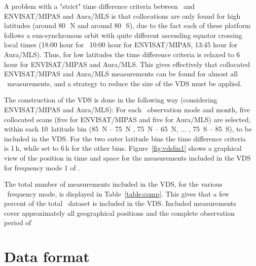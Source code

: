 A problem with a "strict" time difference criteria
between \smr\ and  ENVISAT/MIPAS and Aura/MLS
is that collocations are only found for high latitudes
 (around 80\,\degree\ N and around 80\,\degree\ S),
due to the fact each of these platform follows a sun-synchronous orbit
with quite different ascending equator crossing local times  
(18:00 hour for \smr\, 10:00 hour for ENVISAT/MIPAS,
 13:45 hour for Aura/MLS). 
Thus, for low latitudes the time difference criteria
is relaxed to 6\,hour for ENVISAT/MIPAS and Aura/MLS.
This gives effectively that collocated ENVISAT/MIPAS and Aura/MLS 
measurements can be found for almost all \smr\ measurements, and a strategy
to reduce the size of the VDS must be applied.

The construction of the VDS is done in the following way (considering ENVISAT/MIPAS and Aura/MLS):
For each \smr\ observation mode and month, five collocated scans
(five for ENVISAT/MIPAS and five for Aura/MLS)  
are selected, within each 10\degree\ latitude bin
(85\degree\ N -- 75\degree\ N , 75\degree\ N -- 65\degree\ N, ... , 75\degree\ S -- 85\degree\ S),
to be included in the VDS. For the two outer latitude bins the
time difference criteria is 1\,h, while set to 6\,h for the other bins.  
Figure~\ref{fig:vdsfm1} shows a graphical view of the position in
time and space for the measurements included in the VDS for
frequency mode 1 of \smr.   

The total number of measurements included in the VDS, for the various \smr\ frequency mode,
is displayed in Table~\ref{table:comp}. This gives that a few percent of the total \smr\
dataset is included in the VDS. Included measurements cover approximately 
all geographical positions and the complete observation period of \smr\. 




\section{Data format}
\label{sec:dataformat}
